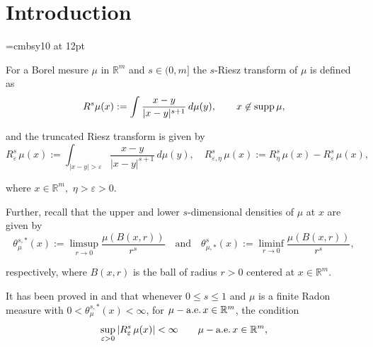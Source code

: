 \documentclass{elsart3-1}
\newcommand{\RR}{{\mathbb{R}}}
\newcommand{\eps}{\varepsilon}
\begin{document}





\section{Introduction}
\label{}


\font\tretamajka=cmbsy10 at 12pt

For a Borel mesure $\mu$ in $\RR^m$ and $s\in (0,m]$ the $s$-Riesz transform of $\mu$ is defined as
\begin{equation}\label{eq1.1}
R^s \mu(x):=\int\frac{x-y}{|x-y|^{s+1}}\,d\mu(y), \qquad x\not\in {\rm supp}\,\mu,
\end{equation}

\noindent and the truncated Riesz transform is given by
\begin{equation}\label{eq1.2}
R^s_{\eps}\, \mu(x):=\int_{|x-y|>\eps}\frac{x-y}{|x-y|^{s+1}}\,d\mu(y), \quad R^s_{\eps,\eta}\, \mu(x):=R^s_{\eta}\, \mu(x)-R^s_{\eps}\, \mu(x),
\end{equation}

\noindent where $x\in\RR^m,$ $\eta>\eps>0$.

Further, recall that the upper and lower $s$-dimensional densities of $\mu$ at $x$ are given by  
\begin{equation}\label{eq1.2.1}
\theta^{s,\ast}_{\mu}(x):=\limsup_{r\to 0}\frac{\mu(B(x,r))}{r^s} \quad\mbox{and}\quad \theta^{s}_{\mu,\ast}(x):=\liminf_{r\to 0}\frac{\mu(B(x,r))}{r^s},
\end{equation}

\noindent respectively, where $B(x,r)$ is the ball of radius $r>0$ centered at $x\in \RR^m$. 

It has been proved in \cite{Pr1} and \cite{Pr2} that whenever $0\leq s\leq 1$ and $\mu$ is a finite Radon measure with $0<\theta^{s,\ast}_{\mu}(x)<\infty$, for $\mu - {\rm a.e.}\,x\in\RR^m$,
the condition 
\begin{equation}\label{eq1.2.2}
\sup_{\eps>0} |R_{\eps}^s\,\mu(x)|<\infty\qquad \mu - {\rm a.e.}\,x\in\RR^m,
\end{equation}
\end{document}
